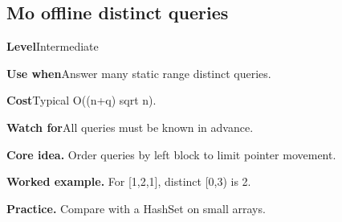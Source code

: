 \documentclass[10pt,letterpaper]{article}
\newcommand{\entrylabel}[1]{\textcolor{accent}{\bfseries #1}}
\begin{document}
\subsection{Mo offline distinct queries}
\begin{guidebox}\small
\entrylabel{Level}\quad Intermediate\par
\entrylabel{Use when}\quad Answer many static range distinct queries.\par
\entrylabel{Cost}\quad Typical O((n+q) sqrt n).\par
\entrylabel{Watch for}\quad All queries must be known in advance.\par
\end{guidebox}
\noindent\textbf{Core idea.} Order queries by left block to limit pointer movement.\par
\noindent\textbf{Worked example.} For [1,2,1], distinct [0,3) is 2.\par
\noindent\textbf{Practice.} Compare with a HashSet on small arrays.\par
\end{document}

